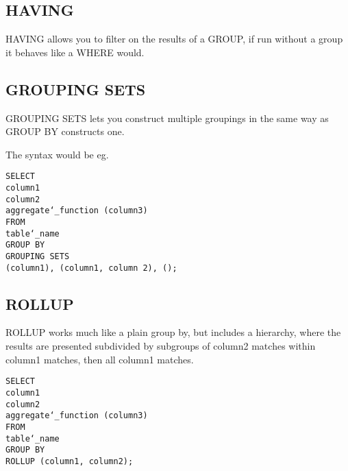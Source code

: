 \documentclass[10pt, english]{article}
\begin{document}
\subsection{HAVING}
HAVING allows you to filter on the results of a GROUP, if run without a group it behaves like a WHERE would.

\subsection{GROUPING SETS}
GROUPING SETS lets you construct multiple groupings in the same way as GROUP BY constructs one.

The syntax would be eg.

\texttt{SELECT\\
\hspace*{10pt} column1 \\
\hspace*{10pt} column2 \\
\hspace*{10pt} aggregate\char`_function (column3) \\
FROM \\
\hspace*{10pt} table\char`_name\\
GROUP BY \\
\hspace*{10pt} GROUPING SETS \\
\hspace*{10pt} \hspace*{10pt} (column1),
\hspace*{10pt} \hspace*{10pt} (column1, column 2),
\hspace*{10pt} \hspace*{10pt} ();
}

\subsection{ROLLUP}
ROLLUP works much like a plain group by, but includes a hierarchy, where the results are presented subdivided by subgroups of 
column2 matches within column1 matches, then all column1 matches.

\texttt{SELECT\\
\hspace*{10pt} column1 \\
\hspace*{10pt} column2 \\
\hspace*{10pt} aggregate\char`_function (column3) \\
FROM \\
\hspace*{10pt} table\char`_name\\
GROUP BY\\
\hspace*{10pt} ROLLUP (column1, column2);
}
\end{document}

